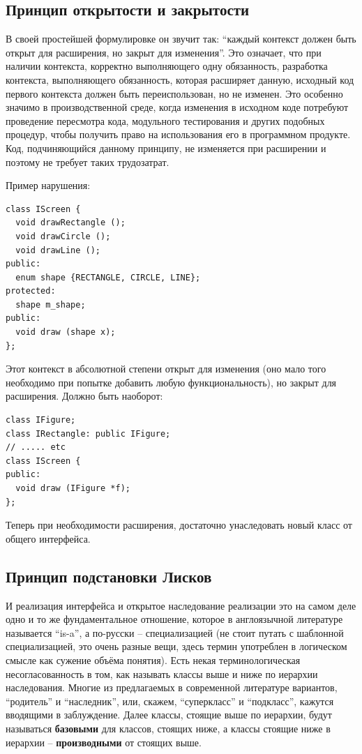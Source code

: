 \documentclass[a4paper,12pt,oneside]{book}
\begin{document}
\subsection{Принцип открытости и закрытости}\label{OCP}

В своей простейшей формулировке он звучит так: ``каждый контекст должен быть открыт для расширения, но закрыт для изменения''. Это означает, что при наличии контекста, корректно выполняющего одну обязанность, разработка контекста, выполняющего обязанность, которая расширяет данную, исходный код первого контекста должен быть переиспользован, но не изменен. Это особенно значимо в производственной среде, когда изменения в исходном коде потребуют проведение пересмотра кода, модульного тестирования и других подобных процедур, чтобы получить право на использования его в программном продукте. Код, подчиняющийся данному принципу, не изменяется при расширении и поэтому не требует таких трудозатрат.

Пример нарушения:

\begin{lstlisting}
class IScreen {
  void drawRectangle ();
  void drawCircle ();
  void drawLine ();
public:
  enum shape {RECTANGLE, CIRCLE, LINE};
protected:
  shape m_shape;
public:
  void draw (shape x);  
};
\end{lstlisting}

Этот контекст в абсолютной степени открыт для изменения (оно мало того необходимо при попытке добавить любую функциональность), но закрыт для расширения. Должно быть наоборот:

\begin{lstlisting}
class IFigure;
class IRectangle: public IFigure;
// ..... etc
class IScreen {
public:
  void draw (IFigure *f);
};
\end{lstlisting}

Теперь при необходимости расширения, достаточно унаследовать новый класс от общего интерфейса.

\subsection{Принцип подстановки Лисков}\label{LSP}

И реализация интерфейса и открытое наследование реализации это на самом деле одно и то же фундаментальное отношение, которое в англоязычной литературе называется ``is-a'', а по-русски -- специализацией (не стоит путать с шаблонной специализацией, это очень разные вещи, здесь термин употреблен в логическом смысле как сужение объёма понятия). Есть некая терминологическая несогласованность в том, как называть классы выше и ниже по иерархии наследования. Многие из предлагаемых в современной литературе вариантов, ``родитель'' и ``наследник'', или, скажем, ``суперкласс'' и ``подкласс'', кажутся вводящими в заблуждение. Далее классы, стоящие выше по иерархии, будут называться \textbf{базовыми} для классов, стоящих ниже, а классы стоящие ниже в иерархии -- \textbf{производными} от стоящих выше.
\end{document}

